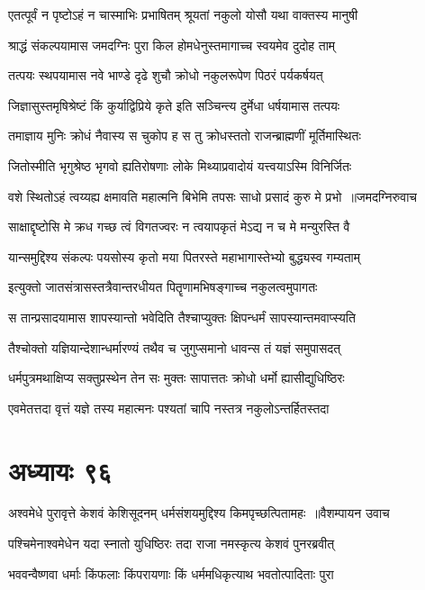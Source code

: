 \twolineshloka
{एतत्पूर्वं न पृष्टोऽहं न चास्माभिः प्रभाषितम्}
{श्रूयतां नकुलो योसौ यथा वाक्तस्य मानुषी}


\twolineshloka
{श्राद्धं संकल्पयामास जमदग्निः पुरा किल}
{होमधेनुस्तमागाच्च स्वयमेव दुदोह ताम्}


\twolineshloka
{तत्पयः स्थपयामास नवे भाण्डे दृढे शुचौ}
{क्रोधो नकुलरूपेण पिठरं पर्यकर्षयत्}


\twolineshloka
{जिज्ञासुस्तमृषिश्रेष्टं किं कुर्याद्विप्रिये कृते}
{इति सञ्चिन्त्य दुर्मेधा धर्षयामास तत्पयः}


\twolineshloka
{तमाज्ञाय मुनिः क्रोधं नैवास्य स चुकोप ह}
{स तु क्रोधस्ततो राजन्ब्राह्मणीं मूर्तिमास्थितः}


\twolineshloka
{जितोस्मीति भृगुश्रेष्ठ भृगवो ह्यतिरोषणाः}
{लोके मिथ्याप्रवादोयं यत्त्वयाऽस्मि विनिर्जितः}


\threelineshloka
{वशे स्थितोऽहं त्वय्यह्य क्षमावति महात्मनि}
{बिभेमि तपसः साधो प्रसादं कुरु मे प्रभो ॥जमदग्निरुवाच}
{}


\twolineshloka
{साक्षाद्दृष्टोसि मे क्रध गच्छ त्वं विगतज्वरः}
{न त्वयापकृतं मेऽद्य न च मे मन्युरस्ति वै}


\twolineshloka
{यान्समुद्दिश्य संकल्पः पयसोस्य कृतो मया}
{पितरस्ते महाभागास्तेभ्यो बुद्ध्यस्व गम्यताम्}


\twolineshloka
{इत्युक्तो जातसंत्रासस्तत्रैवान्तरधीयत}
{पितॄणामभिषङ्गाच्च नकुलत्वमुपागतः}


\twolineshloka
{स तान्प्रसादयामास शापस्यान्तो भवेदिति}
{तैश्चाप्युक्तः क्षिपन्धर्मं सापस्यान्तमवाप्स्यति}


\twolineshloka
{तैश्चोक्तो यज्ञियान्देशान्धर्मारण्यं तथैव च}
{जुगुप्समानो धावन्स तं यज्ञं समुपासदत्}


\twolineshloka
{धर्मपुत्रमथाक्षिप्य सक्तुप्रस्थेन तेन सः}
{मुक्तः सापात्ततः क्रोधो धर्मो ह्यासीद्युधिष्ठिरः}


\threelineshloka
{एवमेतत्तदा वृत्तं यज्ञे तस्य महात्मनः}
{पश्यतां चापि नस्तत्र नकुलोऽन्तर्हितस्तदा}
{}


\chapter{अध्यायः ९६}
\threelineshloka
{अश्वमेधे पुरावृत्ते केशवं केशिसूदनम्}
{धर्मसंशयमुद्दिश्य किमपृच्छत्पितामहः ॥वैशम्पायन उवाच}
{}


\twolineshloka
{पश्चिमेनाश्वमेधेन यदा स्नातो युधिष्ठिरः}
{तदा राजा नमस्कृत्य केशवं पुनरब्रवीत्}


\twolineshloka
{भववन्वैष्णवा धर्माः किंफलाः किंपरायणाः}
{किं धर्ममधिकृत्याथ भवतोत्पादिताः पुरा}


